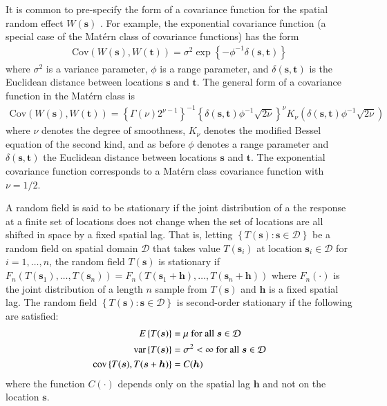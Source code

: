 \documentclass[authoryear, review, 11pt]{elsarticle}
\begin{document}
It is common to pre-specify the form of a covariance function for the spatial random effect $W(\bm{s})$ \citep{Diggle:2007}. For example, the exponential covariance function (a special case of the Mat\'{e}rn class of covariance functions) has the form
\begin{align}\label{eq:exponential-covariance}
    \text{Cov}(W(\bm{s}), W(\bm{t})) = \sigma^2 \exp\left\{-\phi^{-1} \delta(\bm{s}, \bm{t}) \right\}
\end{align}
where $\sigma^2$ is a variance parameter, $\phi$ is a range parameter, and $\delta(\bm{s}, \bm{t})$ is the Euclidean distance between locations $\bm{s}$ and $\bm{t}$. The general form of a covariance function in the Mat\'{e}rn class is
\begin{align}\label{eq:matern-covarinace}
    \text{Cov}(W(\bm{s}), W(\bm{t})) = \left\{\Gamma(\nu) 2^{\nu-1} \right\}^{-1} \left\{\delta(\bm{s}, \bm{t}) \phi^{-1}\sqrt{2\nu}\right\}^\nu K_{\nu} \left(\delta(\bm{s}, \bm{t}) \phi^{-1}\sqrt{2\nu}\right)
    \end{align}
where $\nu$ denotes the degree of smoothness, $K_{\nu}$ denotes the modified Bessel equation of the second kind, and as before $\phi$ denotes a range parameter and $\delta(\bm{s}, \bm{t})$ the Euclidean distance between locations $\bm{s}$ and $\bm{t}$. The exponential covariance function corresponds to a Mat\'{e}rn class covariance function with $\nu = 1/2$.

	A random field is said to be stationary if the joint distribution of a the response at a finite set of locations does not change when the set of locations are all shifted in space by a fixed spatial lag. That is, letting $\left\{T(\bm{s}) : \bm{s} \in \mathcal{D}\right\}$ be a random field on spatial domain $\mathcal{D}$ that takes value $T(\bm{s}_i)$ at location $\bm{s}_i \in \mathcal{D}$ for $i = 1, \dots, n$, the random field $T(\bm{s})$ is stationary if $F_n\left(T(\bm{s}_1), \dots, T(\bm{s}_n)\right) = F_n\left(T(\bm{s}_1+\bm{h}), \dots, T(\bm{s}_n+\bm{h})\right)$ where $F_n(\cdot)$ is the joint distribution of a length $n$ sample from $T(\bm{s})$ and $\bm{h}$ is a fixed spatial lag. The random field $\left\{T(\bm{s}) : \bm{s} \in \mathcal{D}\right\}$ is second-order stationary if the following are satisfied:
	\begin{align}
		E\left\{ T(\bm{s}) \right\} &= \mu \text{ for all } \bm{s} \in \mathcal{D} \notag \\
		\text{var}\left\{T(\bm{s})\right\} &= \sigma^2 < \infty \text{ for all } \bm{s} \in \mathcal{D} \notag \\
		\text{cov}\left\{ T(\bm{s}), T(\bm{s} + \bm{h}) \right\} &= C(\bm{h})
	\end{align}
	where the function $C(\cdot)$ depends only on the spatial lag $\bm{h}$ and not on the location $\bm{s}$.
	
\end{document}

